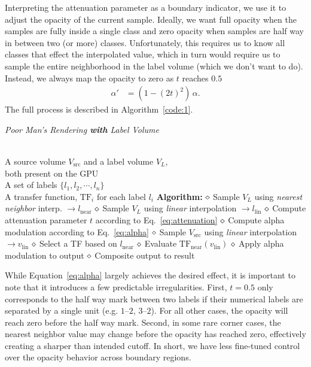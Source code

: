 \documentclass{egpubl}
\begin{document}
Interpreting the attenuation parameter as a boundary indicator, we use it to adjust the opacity of the current sample. Ideally, we want full opacity when the samples are fully inside a single class and zero opacity when samples are half way in between two (or more) classes. Unfortunately, this requires us to know all classes that effect the interpolated value, which in turn would require us to sample the entire neighborhood in the label volume (which we don't want to do). Instead, we always map the opacity to zero as $t$ reaches $0.5$ 
\begin{align}
\alpha' &= (1-(2t)^2) \,\alpha  .  \label{eq:alpha}
\end{align}
The full process is described in Algorithm~\ref{code:1}.

\begin{algorithm}[t]
\caption{\label{code:1} \emph{Poor Man's Rendering \textbf{with} Label Volume}}
\begin{algorithmic}
\REQUIRE \quad\\
A source volume $V_\mathrm{src}$ and a label volume $V_L$,\\both present on the GPU\\
A set of labels $\{ l_1, l_2, \cdots, l_n \}$ \\
A transfer function, $\mathrm{TF}_i$ for each label $l_i$ 
\STATE \hspace{-3mm}\textbf{Algorithm:}
 \nonumber
\STATE $\diamond$ Sample $V_L$ using \emph{nearest neighbor} interp. $\rightarrow l_\mathrm{near}$
\STATE $\diamond$ Sample $V_L$ using \emph{linear} interpolation $\rightarrow l_\mathrm{lin}$
\STATE $\diamond$ Compute attenuation parameter $t$ according to Eq.~\ref{eq:attenuation}
\STATE $\diamond$ Compute alpha modulation according to Eq.~\ref{eq:alpha}
\STATE $\diamond$ Sample $V_\mathrm{src}$ using \emph{linear} interpolation $\rightarrow v_\mathrm{lin}$ 
\STATE $\diamond$ Select a TF based on $l_\mathrm{near}$
\STATE $\diamond$ Evaluate $\mathrm{TF}_\mathrm{near}(v_\mathrm{lin})$ 
\STATE $\diamond$ Apply alpha modulation to output
\STATE $\diamond$ Composite output to result
\ENDFOR
\end{algorithmic}
\end{algorithm}

While Equation~\ref{eq:alpha} largely achieves the desired effect, it is important to note that it introduces a few predictable irregularities. First, $t=0.5$ only corresponds to the half way mark between two labels if their numerical labels are separated by a single unit (e.g. $1$--$2$, $3$--$2$). For all other cases, the opacity will reach zero before the half way mark. Second, in some rare corner cases, the nearest neighbor value may change before the opacity has reached zero, effectively creating a sharper than intended cutoff. In short, we have less fine-tuned control over the opacity behavior across boundary regions. 
\end{document}
